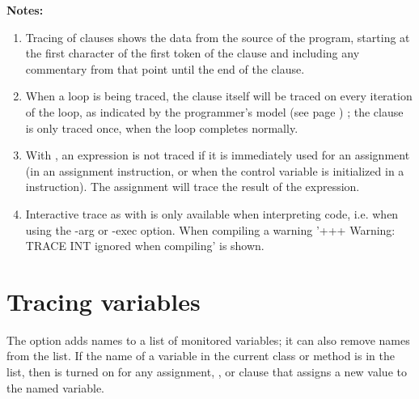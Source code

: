  \textbf{Notes:}
\begin{enumerate}
\item Tracing of clauses shows the data from the source of the program,
starting at the first character of the first token of the clause and
including any commentary from that point until the end of the clause.
\item When a loop is being traced, the  clause itself will be
traced on every iteration of the loop, as indicated by the
 programmer's model (see page \pageref{refloopmod}) ; the  clause is only
traced once, when the loop completes normally.
\item With , an expression is not traced if it is
immediately used for an assignment (in an assignment instruction, or
when the control variable is initialized in a 
instruction).
The assignment will trace the result of the expression.
\item Interactive trace as with  is only available when 
interpreting code, i.e. when using the -arg or -exec option. When compiling
 a warning '+++ Warning: TRACE INT ignored when compiling' is shown.
\end{enumerate}
\section{Tracing variables}
 
The  option adds names to a list of monitored
variables; it can also remove names from the list.  If the name of a
variable in the current class or method is in the list, then  is turned on for any assignment, , or
 clause that assigns a new value to the named
variable.
 
